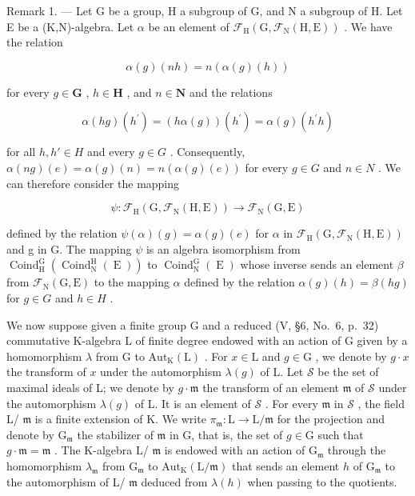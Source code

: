 Remark 1. --- Let G be a group, H a subgroup of G, and N a subgroup of H. Let E be a (K,N)-algebra. Let \(\alpha\) be an element of \(\mathcal{F}_{\mathrm{H}}(\mathrm{G},\mathcal{F}_{\mathrm{N}}(\mathrm{H},\mathrm{E}))\) . We have the relation

\[
\alpha (g) (n h) = n (\alpha (g) (h))\tag{16}
\]

for every \(g \in \mathbf{G}\) , \(h \in \mathbf{H}\) , and \(n \in \mathbf{N}\) and the relations

\[
\alpha (h g) (h ^ {\prime}) = (h \alpha (g)) (h ^ {\prime}) = \alpha (g) (h ^ {\prime} h)\tag{17}
\]

for all \(h, h' \in H\) and every \(g \in G\) . Consequently, \(\alpha(ng)(e) = \alpha(g)(n) = n(\alpha(g)(e))\) for every \(g \in G\) and \(n \in N\) . We can therefore consider the mapping

\[
\psi : \mathcal {F} _ {\mathrm{H}} (\mathrm{G}, \mathcal {F} _ {\mathrm{N}} (\mathrm{H}, \mathrm{E})) \to \mathcal {F} _ {\mathrm{N}} (\mathrm{G}, \mathrm{E})
\]

defined by the relation \(\psi(\alpha)(g)=\alpha(g)(e)\) for \(\alpha\) in \(\mathcal{F}_{\mathrm{H}}(\mathrm{G},\mathcal{F}_{\mathrm{N}}(\mathrm{H},\mathrm{E}))\) and g in G. The mapping \(\psi\) is an algebra isomorphism from \(\operatorname{Coind}_{\mathrm{H}}^{\mathrm{G}}(\operatorname{Coind}_{\mathrm{N}}^{\mathrm{H}}(\operatorname{E}))\) to \(\operatorname{Coind}_{\mathrm{N}}^{\mathrm{G}}(\operatorname{E})\) whose inverse sends an element \(\beta\) from \(\mathcal{F}_{\mathrm{N}}(\mathrm{G},\mathrm{E})\) to the mapping \(\alpha\) defined by the relation \(\alpha(g)(h)=\beta(hg)\) for \(g\in G\) and \(h\in H\) .

We now suppose given a finite group G and a reduced (V, §6, No.~6, p.~32) commutative K-algebra L of finite degree endowed with an action of G given by a homomorphism \(\lambda\) from G to \(\mathrm{Aut}_{\mathrm{K}}(\mathrm{L})\) . For \(x \in \mathrm{L}\) and \(g \in \mathrm{G}\) , we denote by \(g \cdot x\) the transform of \(x\) under the automorphism \(\lambda(g)\) of L. Let \(\mathcal{S}\) be the set of maximal ideals of L; we denote by \(g \cdot \mathfrak{m}\) the transform of an element \(\mathfrak{m}\) of \(\mathcal{S}\) under the automorphism \(\lambda(g)\) of L. It is an element of \(\mathcal{S}\) . For every \(\mathfrak{m}\) in \(\mathcal{S}\) , the field L/ \(\mathfrak{m}\) is a finite extension of K. We write \(\pi_{\mathfrak{m}}: \mathrm{L} \to \mathrm{L}/\mathfrak{m}\) for the projection and denote by \(\mathrm{G}_{\mathfrak{m}}\) the stabilizer of \(\mathfrak{m}\) in G, that is, the set of \(g \in \mathrm{G}\) such that \(g \cdot \mathfrak{m} = \mathfrak{m}\) . The K-algebra L/ \(\mathfrak{m}\) is endowed with an action of \(\mathrm{G}_{\mathfrak{m}}\) through the homomorphism \(\lambda_{\mathfrak{m}}\) from \(\mathrm{G}_{\mathfrak{m}}\) to \(\mathrm{Aut}_{\mathrm{K}}(\mathrm{L}/\mathfrak{m})\) that sends an element \(h\) of \(\mathrm{G}_{\mathfrak{m}}\) to the automorphism of L/ \(\mathfrak{m}\) deduced from \(\lambda(h)\) when passing to the quotients.

